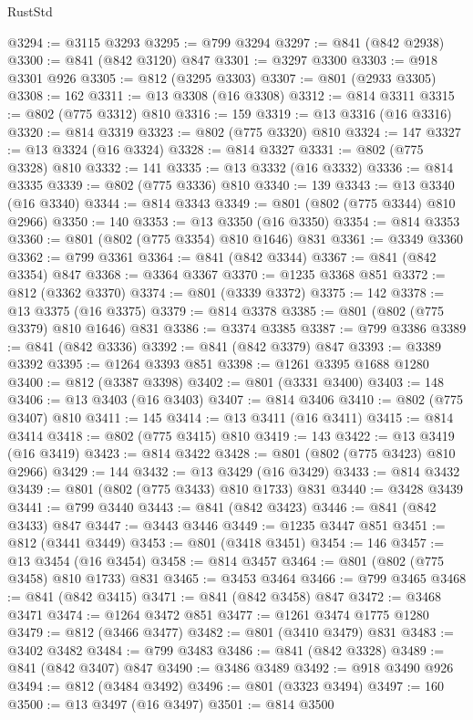 \begin{lexlean}{RustStd}
\begin{coremodule}
@3294 := @3115 @3293
@3295 := @799 @3294
@3297 := @841 (@842 @2938)
@3300 := @841 (@842 @3120) @847
@3301 := @3297 @3300
@3303 := @918 @3301 @926
@3305 := @812 (@3295 @3303)
@3307 := @801 (@2933 @3305)
@3308 := 162
@3311 := @13 @3308 (@16 @3308)
@3312 := @814 @3311
@3315 := @802 (@775 @3312) @810
@3316 := 159
@3319 := @13 @3316 (@16 @3316)
@3320 := @814 @3319
@3323 := @802 (@775 @3320) @810
@3324 := 147
@3327 := @13 @3324 (@16 @3324)
@3328 := @814 @3327
@3331 := @802 (@775 @3328) @810
@3332 := 141
@3335 := @13 @3332 (@16 @3332)
@3336 := @814 @3335
@3339 := @802 (@775 @3336) @810
@3340 := 139
@3343 := @13 @3340 (@16 @3340)
@3344 := @814 @3343
@3349 := @801 (@802 (@775 @3344) @810 @2966)
@3350 := 140
@3353 := @13 @3350 (@16 @3350)
@3354 := @814 @3353
@3360 := @801 (@802 (@775 @3354) @810 @1646) @831
@3361 := @3349 @3360
@3362 := @799 @3361
@3364 := @841 (@842 @3344)
@3367 := @841 (@842 @3354) @847
@3368 := @3364 @3367
@3370 := @1235 @3368 @851
@3372 := @812 (@3362 @3370)
@3374 := @801 (@3339 @3372)
@3375 := 142
@3378 := @13 @3375 (@16 @3375)
@3379 := @814 @3378
@3385 := @801 (@802 (@775 @3379) @810 @1646) @831
@3386 := @3374 @3385
@3387 := @799 @3386
@3389 := @841 (@842 @3336)
@3392 := @841 (@842 @3379) @847
@3393 := @3389 @3392
@3395 := @1264 @3393 @851
@3398 := @1261 @3395 @1688 @1280
@3400 := @812 (@3387 @3398)
@3402 := @801 (@3331 @3400)
@3403 := 148
@3406 := @13 @3403 (@16 @3403)
@3407 := @814 @3406
@3410 := @802 (@775 @3407) @810
@3411 := 145
@3414 := @13 @3411 (@16 @3411)
@3415 := @814 @3414
@3418 := @802 (@775 @3415) @810
@3419 := 143
@3422 := @13 @3419 (@16 @3419)
@3423 := @814 @3422
@3428 := @801 (@802 (@775 @3423) @810 @2966)
@3429 := 144
@3432 := @13 @3429 (@16 @3429)
@3433 := @814 @3432
@3439 := @801 (@802 (@775 @3433) @810 @1733) @831
@3440 := @3428 @3439
@3441 := @799 @3440
@3443 := @841 (@842 @3423)
@3446 := @841 (@842 @3433) @847
@3447 := @3443 @3446
@3449 := @1235 @3447 @851
@3451 := @812 (@3441 @3449)
@3453 := @801 (@3418 @3451)
@3454 := 146
@3457 := @13 @3454 (@16 @3454)
@3458 := @814 @3457
@3464 := @801 (@802 (@775 @3458) @810 @1733) @831
@3465 := @3453 @3464
@3466 := @799 @3465
@3468 := @841 (@842 @3415)
@3471 := @841 (@842 @3458) @847
@3472 := @3468 @3471
@3474 := @1264 @3472 @851
@3477 := @1261 @3474 @1775 @1280
@3479 := @812 (@3466 @3477)
@3482 := @801 (@3410 @3479) @831
@3483 := @3402 @3482
@3484 := @799 @3483
@3486 := @841 (@842 @3328)
@3489 := @841 (@842 @3407) @847
@3490 := @3486 @3489
@3492 := @918 @3490 @926
@3494 := @812 (@3484 @3492)
@3496 := @801 (@3323 @3494)
@3497 := 160
@3500 := @13 @3497 (@16 @3497)
@3501 := @814 @3500

\end{coremodule}
\end{lexlean}
